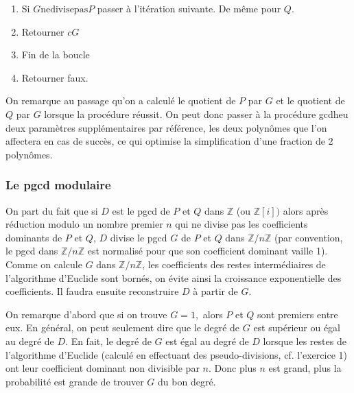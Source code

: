 \documentclass[a4paper,11pt]{article}
\begin{document}
\begin{giacjshere}
\begin{enumerate}
  \item Si $G \mbox{ne} \mbox{divise} \mbox{pas}$$P$ passer à l'itération
  suivante. De même pour $Q$.
  
  \item Retourner $c G$
  
  \item Fin de la boucle
  
  \item Retourner faux.
\end{enumerate}
On remarque au passage qu'on a calculé le quotient de $P$ par $G$ et le
quotient de $Q$ par $G$ lorsque la procédure réussit. On peut donc passer à la
procédure gcdheu deux paramètres supplémentaires par référence, les deux
polynômes que l'on affectera en cas de succès, ce qui optimise la
simplification d'une fraction de 2 polynômes.

\subsubsection{Le pgcd modulaire}

On part du fait que si $D$ est le pgcd de $P$ et $Q$ dans $\mathbb{Z}$ (ou
$\mathbb{Z} [ i ] )$ alors après réduction modulo un nombre premier $n$ qui ne
divise pas les coefficients dominants de $P$ et $Q$, $D$ divise le pgcd $G$ de
$P$ et $Q$ dans $\mathbb{Z} / n \mathbb{Z}$ (par convention, le pgcd dans
$\mathbb{Z} / n \mathbb{Z}$ est normalisé pour que son coefficient dominant
vaille 1). Comme on calcule $G$ dans $\mathbb{Z} / n \mathbb{Z}$, les
coefficients des restes intermédiaires de l'algorithme d'Euclide sont bornés,
on évite ainsi la croissance exponentielle des coefficients. Il faudra ensuite
reconstruire $D$ à partir de $G$.

On remarque d'abord que si on trouve $G = 1,$ alors $P$ et $Q$ sont premiers
entre eux. En général, on peut seulement dire que le degré de $G$ est
supérieur ou égal au degré de $D$. En fait, le degré de $G$ est égal au degré
de $D$ lorsque les restes de l'algorithme d'Euclide (calculé en effectuant des
pseudo-divisions, cf. l'exercice 1) ont leur coefficient dominant non
divisible par $n$. Donc plus $n$ est grand, plus la probabilité est grande de
trouver $G$ du bon degré.


\end{giacjshere}
\end{document}
